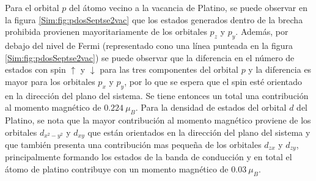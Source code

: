 Para el orbital $p$ del \'atomo vecino a la vacancia de Platino,  se puede  observar en la figura \ref{Sim:fig:pdosSeptse2vac} que los estados generados dentro de la brecha prohibida provienen mayoritariamente de  los orbitales $p_z$ y $p_y$. Adem\'as, por debajo del nivel de Fermi (representado cono una l\'inea punteada en la figura \ref{Sim:fig:pdosSeptse2vac}) se puede observar que la diferencia en el n\'umero de estados con spin $\uparrow$ y $\downarrow$ para las tres componentes del orbital $p$ y la diferencia es mayor para los orbitales $p_x$ y $p_y$, por lo que se espera que el spin est\'e orientado en la direcci\'on del plano del sistema. Se tiene entonces un total una contribuci\'on al momento magn\'etico  de $0.224 ~\mu_{B}$. Para  la densidad de estados del orbital $d$ del Platino,  se  nota que la mayor contribuci\'on al momento magn\'etico proviene de los orbitales $d_{x^2-y^2}$ y $d_{xy}$ que est\'an orientados en la direcci\'on del plano del sistema y que tambi\'en presenta una contribuci\'on mas peque\~na de los orbitales $d_{zx}$ y $d_{zy}$, principalmente formando los estados de la banda de conducci\'on y en total el \'atomo de platino contribuye  con un momento magn\'etico de $0.03~ \mu_{B}$.

